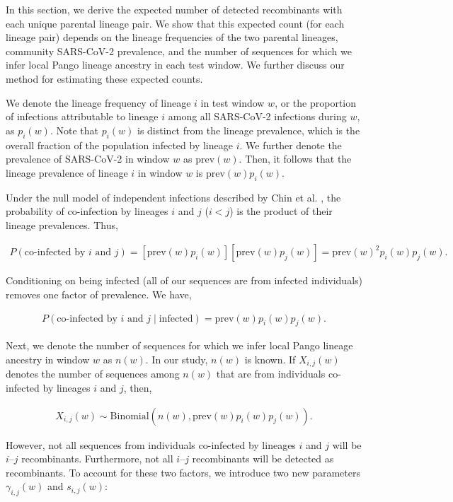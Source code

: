 \documentclass[11pt,oneside,letterpaper]{article}
\begin{document}
In this section, we derive the expected number of detected recombinants with each unique parental lineage pair. We show that this expected count (for each lineage pair) depends on the lineage frequencies of the two parental lineages, community SARS-CoV-2 prevalence, and the number of sequences for which we infer local Pango lineage ancestry in each test window. We further discuss our method for estimating these expected counts.

We denote the lineage frequency of lineage $i$ in test window $w$, or the proportion of infections attributable to lineage $i$ among all SARS-CoV-2 infections during $w$, as $p_i(w)$. Note that $p_i(w)$ is distinct from the lineage prevalence, which is the overall fraction of the population infected by lineage $i$. We further denote the prevalence of SARS-CoV-2 in window $w$ as $\mathrm{prev}(w)$. Then, it follows that the lineage prevalence of lineage $i$ in window $w$ is $\mathrm{prev}(w)p_i(w)$.

Under the null model of independent infections described by Chin et al. \cite{chin_considerations_2024}, the probability of co-infection by lineages $i$ and $j$ ($i < j$) is the product of their lineage prevalences. Thus,

\begin{align*}
P(\text{co-infected by }i\text{ and }j) = \left[\mathrm{prev}(w)p_i(w)\right]\left[\mathrm{prev}(w)p_j(w)\right]
= \mathrm{prev}(w)^2p_i(w)p_j(w).
\end{align*}

Conditioning on being infected (all of our sequences are from infected individuals) removes one factor of prevalence. We have,

\begin{align*}
P(\text{co-infected by }i\text{ and }j \mid \text{infected}) = \mathrm{prev}(w)p_i(w)p_j(w).
\end{align*}

Next, we denote the number of sequences for which we infer local Pango lineage ancestry in window $w$ as $n(w)$. In our study, $n(w)$ is known. If $X_{i,j}(w)$ denotes the number of sequences among $n(w)$ that are from individuals co-infected by lineages $i$ and $j$, then,

\begin{align*}
X_{i,j}(w) \sim \mathrm{Binomial}(n(w), \mathrm{prev}(w)p_i(w)p_j(w)).
\end{align*}

However, not all sequences from individuals co-infected by lineages $i$ and $j$ will be $i\text{--}j$ recombinants. Furthermore, not all $i\text{--}j$ recombinants will be detected as recombinants. To account for these two factors, we introduce two new parameters $\gamma_{i,j}(w)$ and $s_{i,j}(w)$:
\end{document}
